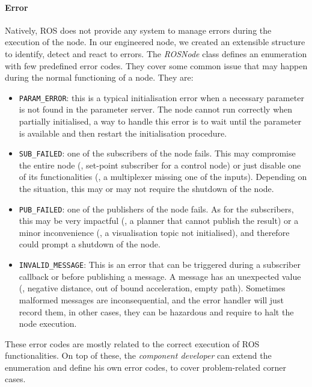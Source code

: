 \paragraph{Error} Natively, ROS does not provide any system to manage errors during the execution of the node. In our engineered node, we created an extensible structure to identify, detect and react to errors. The \textit{ROSNode} class defines an enumeration with few predefined error codes. They cover some common issue that may happen during the normal functioning of a node. They are:
\begin{itemize}
\item \texttt{PARAM\_ERROR}: this is a typical initialisation error when a necessary parameter is not found in the parameter server. The node cannot run correctly when partially initialised, a way to handle this error is to wait until the parameter is available and then restart the initialisation procedure.
\item \texttt{SUB\_FAILED}: one of the subscribers of the node fails. This may compromise the entire node (\eg, set-point subscriber for a control node) or just disable one of its functionalities (\eg, a multiplexer missing one of the inputs). Depending on the situation, this may or may not require the shutdown of the node. 
\item \texttt{PUB\_FAILED}: one of the publishers of the node fails. As for the subscribers, this may be very impactful (\eg, a planner that cannot publish the result) or a minor inconvenience (\eg, a visualisation topic not initialised), and therefore could prompt a shutdown of the node.
\item \texttt{INVALID\_MESSAGE}: This is an error that can be triggered during a subscriber callback or before publishing a message. A message has an unexpected value (\eg, negative distance, out of bound acceleration, empty path). Sometimes malformed messages are inconsequential, and the error handler will just record them, in other cases, they can be hazardous and require to halt the node execution. 
\end{itemize}

These error codes are mostly related to the correct execution of ROS functionalities. On top of these, the \textit{component developer} can extend the enumeration and define his own error codes, to cover problem-related corner cases. 

